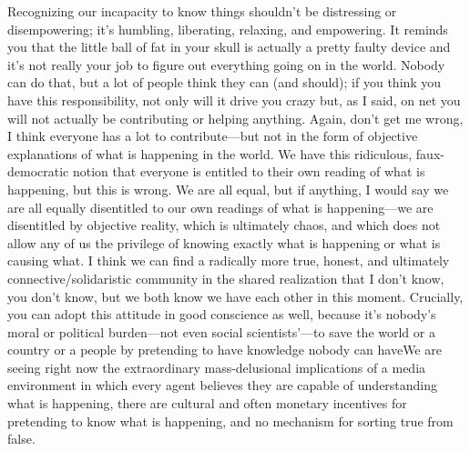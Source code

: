 \documentclass[a4paper,12pt,margin=.5in]{article}
\begin{document}
Recognizing our incapacity to know things shouldn't be distressing or
disempowering; it's humbling, liberating, relaxing, and empowering. It
reminds you that the little ball of fat in your skull is actually a
pretty faulty device and it's not really your job to figure out
everything going on in the world. Nobody can do that, but a lot of
people think they can (and should); if you think you have this
responsibility, not only will it drive you crazy but, as I said, on net
you will not actually be contributing or helping anything. Again, don't
get me wrong, I think everyone has a lot to contribute---but not in the
form of objective explanations of what is happening in the world. We
have this ridiculous, faux-democratic notion that everyone is entitled
to their own reading of what is happening, but this is wrong. We are all
equal, but if anything, I would say we are all equally disentitled to
our own readings of what is happening---we are disentitled by objective
reality, which is ultimately chaos, and which does not allow any of us
the privilege of knowing exactly what is happening or what is causing
what. I think we can find a radically more true, honest, and ultimately
connective/solidaristic community in the shared realization that I don't
know, you don't know, but we both know we have each other in this
moment. Crucially, you can adopt this attitude in good conscience as
well, because it's nobody's moral or political burden---not even social
scientists'---to save the world or a country or a people by pretending
to have knowledge nobody can haveWe are seeing right now the
extraordinary mass-delusional implications of a media environment in
which every agent believes they are capable of understanding what is
happening, there are cultural and often monetary incentives for
pretending to know what is happening, and no mechanism for sorting true
from false.
\end{document}
